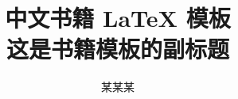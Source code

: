 \documentclass[openany,twoside,zihao=-4]{zhbook}
\title{中文书籍 \LaTeX{} 模板  \\[10pt] \zihao{2} 这是书籍模板的副标题}
\author{某某某}  %
\begin{document}
\maketitle

%



\frontmatter














\maketoc

\makelof

\makelot






\mainmatter


















\end{document}
